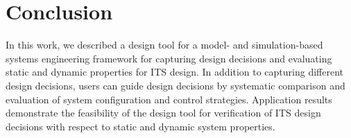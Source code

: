 \documentclass[a4paper,twoside]{article}
\begin{document}
	\section{Conclusion}
	\label{sec:conclusion}
	
In this work, we described a design tool for a model- and simulation-based systems engineering framework for capturing design decisions and evaluating static and dynamic properties for ITS design. In addition to capturing different design decisions, users can guide design decisions by systematic comparison and evaluation of system configuration and control strategies. Application results demonstrate the feasibility of the design tool for verification of ITS design decisions with respect to static and dynamic system properties.
	
	
	{\small
		}
	
	
\end{document}
